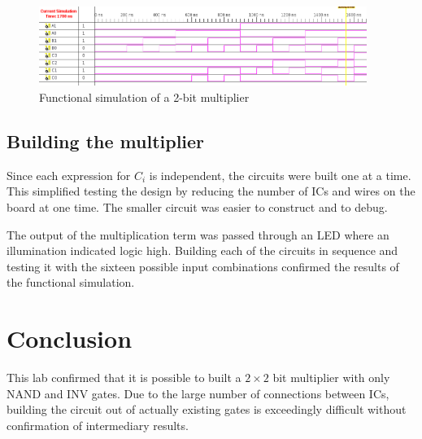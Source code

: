 \documentclass[11pt]{article}
\begin{document}
\begin{figure}[htbp]
	\centering
	\includegraphics[width=0.95\textwidth, draft=false]{functional_sim}
	\caption{Functional simulation of a 2-bit multiplier}
	\label{fig:functional_sim}
\end{figure}

\subsection{Building the multiplier}
Since each expression for $C_i$ is independent, the circuits were built one at a time. This simplified testing the design by reducing the number of ICs and wires on the board at one time. The smaller circuit was easier to construct and to debug. 

The output of the multiplication term was passed through an LED where an illumination indicated logic high. Building each of the circuits in sequence and testing it with the sixteen possible input combinations confirmed the results of the functional simulation.

\section{Conclusion}
This lab confirmed that it is possible to built a $2 \times 2$ bit multiplier with only NAND and INV gates. Due to the large number of connections between ICs, building the circuit out of actually existing gates is exceedingly difficult without confirmation of intermediary results.
\end{document}
